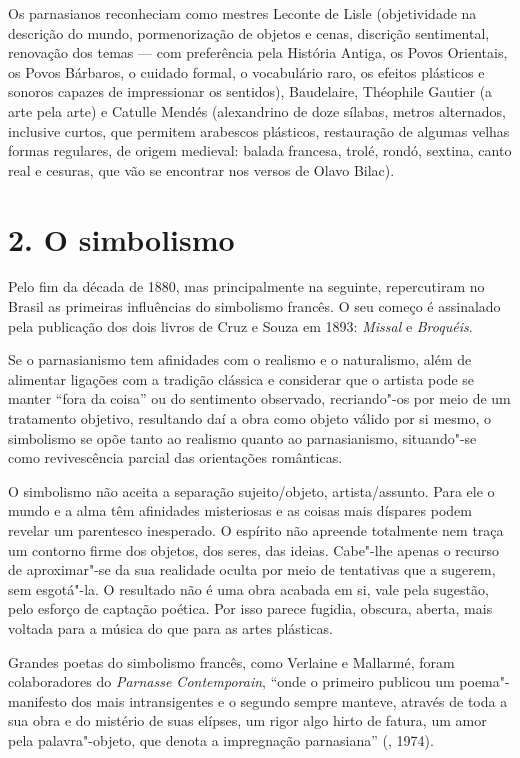 Os parnasianos reconheciam como mestres Leconte de Lisle (objetividade
na descrição do mundo, pormenorização de objetos e cenas, discrição
sentimental, renovação dos temas --- com preferência pela História
Antiga, os Povos Orientais, os Povos Bárbaros, o cuidado formal, o
vocabulário raro, os efeitos plásticos e sonoros capazes de impressionar
os sentidos), Baudelaire, Théophile Gautier (a arte pela arte) e Catulle
Mendés (alexandrino de doze sílabas, metros alternados, inclusive
curtos, que permitem arabescos plásticos, restauração de algumas velhas
formas regulares, de origem medieval: balada francesa, trolé, rondó,
sextina, canto real e cesuras, que vão se encontrar nos versos de Olavo
Bilac).

\section{2. O simbolismo}

Pelo fim da década de 1880, mas principalmente na seguinte, repercutiram
no Brasil as primeiras influências do simbolismo francês. O seu começo é
assinalado pela publicação dos dois livros de Cruz e Souza em 1893:
\emph{Missal} e \emph{Broquéis}.

Se o parnasianismo tem afinidades com o realismo e o naturalismo, além
de alimentar ligações com a tradição clássica e considerar que o artista
pode se manter ``fora da coisa'' ou do sentimento observado,
recriando"-os por meio de um tratamento objetivo, resultando daí a obra
como objeto válido por si mesmo, o simbolismo se opõe tanto ao realismo
quanto ao parnasianismo, situando"-se como revivescência parcial das
orientações românticas.

O simbolismo não aceita a separação sujeito/objeto, artista/assunto.
Para ele o mundo e a alma têm afinidades misteriosas e as coisas mais
díspares podem revelar um parentesco inesperado. O espírito não apreende
totalmente nem traça um contorno firme dos objetos, dos seres, das
ideias. Cabe"-lhe apenas o recurso de aproximar"-se da sua realidade
oculta por meio de tentativas que a sugerem, sem esgotá"-la. O resultado
não é uma obra acabada em si, vale pela sugestão, pelo esforço de
captação poética. Por isso parece fugidia, obscura, aberta, mais voltada
para a música do que para as artes plásticas.

Grandes poetas do simbolismo francês, como Verlaine e Mallarmé, foram
colaboradores do \emph{Parnasse Contemporain}, ``onde o primeiro
publicou um poema"-manifesto dos mais intransigentes e o segundo sempre
manteve, através de toda a sua obra e do mistério de suas elípses, um
rigor algo hirto de fatura, um amor pela palavra"-objeto, que denota a
impregnação parnasiana'' (, 1974).


